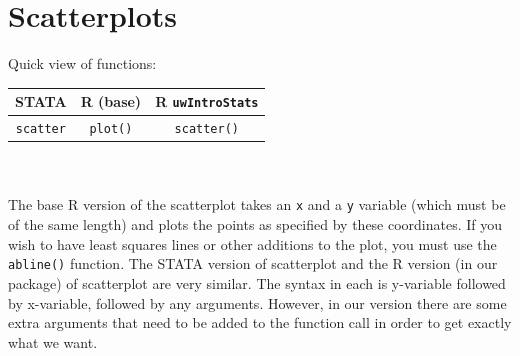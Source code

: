 \documentclass[11pt,letterpaper,fleqn]{report}
\begin{document}
\section{Scatterplots}
Quick view of functions:\\
\begin{tabular}{ccc}
STATA & R (base) & R \texttt{uwIntroStats}\\
\hline
\texttt{scatter} & \texttt{plot()} & \texttt{scatter()}
\end{tabular}\\
\\
The base R version of the scatterplot takes an \texttt{x} and a \texttt{y} variable (which must be of the same length) and plots the points as specified by these coordinates. If you wish to have least squares lines or other additions to the plot, you must use the \texttt{abline()} function. The STATA version of scatterplot and the R version (in our package) of scatterplot are very similar. The syntax in each is y-variable followed by x-variable, followed by any arguments. However, in our version there are some extra arguments that need to be added to the function call in order to get exactly what we want.
\end{document}
